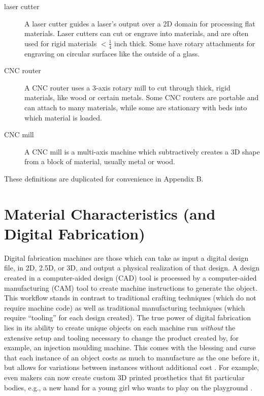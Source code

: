 \begin{description}
\item[laser cutter] A laser cutter guides a laser's output over a 2D domain for processing flat materials. Laser cutters can cut or engrave into materials, and are often used for rigid materials $<\frac{1}{4}$ inch thick. Some have rotary attachments for engraving on circular surfaces like the outside of a glass.

\item[CNC router] A CNC router uses a 3-axis rotary mill to cut through thick, rigid materials, like wood or certain metals. Some CNC routers are portable and can attach to many materials, while some are stationary with beds into which material is loaded.

\item[CNC mill] A CNC mill is a multi-axis machine which subtractively creates a 3D shape from a block of material, usually metal or wood.

\end{description}

These definitions are duplicated for convenience in Appendix B.

\section{Material Characteristics (and Digital Fabrication)}

Digital fabrication machines are those which can take as input a digital design file, in 2D, 2.5D, or 3D, and output a physical realization of that design. A design created in a computer-aided design (CAD) tool is processed by a computer-aided manufacturing (CAM) tool to create machine instructions to generate the object. This workflow stands in contrast to traditional crafting techniques (which do not require machine code) as well as traditional manufacturing techniques (which require ``tooling'' for each design created). The true power of digital fabrication lies in its ability to create unique objects on each machine run \emph{without} the extensive setup and tooling necessary to change the product created by, for example, an injection moulding machine. This comes with the blessing and curse that each instance of an object costs as much to manufacture as the one before it, but allows for variations between instances without additional cost \cite{wright-manufacturing}. For example, even makers can now create custom 3D printed prosthetics that fit particular bodies, e.g., a new hand for a young girl who wants to play on the playground \cite{myers-sophie}.

